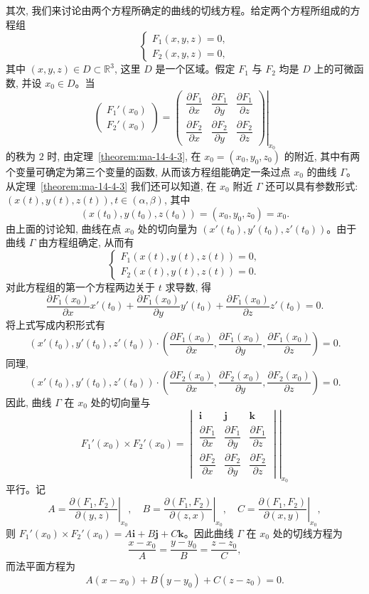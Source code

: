 其次, 我们来讨论由两个方程所确定的曲线的切线方程。给定两个方程所组成的方程组
\[
  \begin{cases}
    F_1(x,y,z)=0,\\
    F_2(x,y,z)=0,
  \end{cases}
\]
其中 $(x,y,z)\in D\subset\mathbb R^3$, 这里 $D$ 是一个区域。假定 $F_1$ 与 $F_2$ 均是 $D$ 上的可微函数, 并设 $x_0\in D$。当
\[
  \begin{pmatrix}
    F_1'(x_0)\\
    F_2'(x_0)
  \end{pmatrix}
  =
  \left.
  \begin{pmatrix}
    \dfrac{\partial F_1}{\partial x} & \dfrac{\partial F_1}{\partial y} & \dfrac{\partial F_1}{\partial z}\\
    \dfrac{\partial F_2}{\partial x} & \dfrac{\partial F_2}{\partial y} & \dfrac{\partial F_2}{\partial z}
  \end{pmatrix}
  \right|_{x_0}
\]
的秩为 $2$ 时, 由定理~\ref{theorem:ma-14-4-3}, 在 $x_0=(x_0,y_0,z_0)$ 的附近, 其中有两个变量可确定为第三个变量的函数, 从而该方程组能确定一条过点 $x_0$ 的曲线 $\Gamma$。从定理~\ref{theorem:ma-14-4-3} 我们还可以知道, 在 $x_0$ 附近 $\Gamma$ 还可以具有参数形式: $(x(t),y(t),z(t)),t\in(\alpha,\beta)$, 其中
\[
  (x(t_0),y(t_0),z(t_0))=(x_0,y_0,z_0)=x_0.
\]
由上面的讨论知, 曲线在点 $x_0$ 处的切向量为 $(x'(t_0),y'(t_0),z'(t_0))$。由于曲线 $\Gamma$ 由方程组确定, 从而有
\[
  \begin{cases}
    F_1(x(t),y(t),z(t))=0,\\
    F_2(x(t),y(t),z(t))=0.
  \end{cases}
\]
对此方程组的第一个方程两边关于 $t$ 求导数, 得
\[
  \frac{\partial F_1(x_0)}{\partial x}x'(t_0)
  +
  \frac{\partial F_1(x_0)}{\partial y}y'(t_0)
  +
  \frac{\partial F_1(x_0)}{\partial z}z'(t_0)
  =0.
\]
将上式写成内积形式有
\[
  (x'(t_0),y'(t_0),z'(t_0))\cdot
  \left(
    \frac{\partial F_1(x_0)}{\partial x},
    \frac{\partial F_1(x_0)}{\partial y},
    \frac{\partial F_1(x_0)}{\partial z}
  \right)
  =0.
\]
同理,
\[
  (x'(t_0),y'(t_0),z'(t_0))\cdot
  \left(
    \frac{\partial F_2(x_0)}{\partial x},
    \frac{\partial F_2(x_0)}{\partial y},
    \frac{\partial F_2(x_0)}{\partial z}
  \right)
  =0.
\]
因此, 曲线 $\Gamma$ 在 $x_0$ 处的切向量与
\[
  F_1'(x_0)\times F_2'(x_0)
  =
  \left.
  \begin{vmatrix}
    \mathbf i & \mathbf j & \mathbf k\\
    \dfrac{\partial F_1}{\partial x} & \dfrac{\partial F_1}{\partial y} & \dfrac{\partial F_1}{\partial z}\\
    \dfrac{\partial F_2}{\partial x} & \dfrac{\partial F_2}{\partial y} & \dfrac{\partial F_2}{\partial z}
  \end{vmatrix}
  \right|_{x_0}
\]
平行。记
\[
  A=\left.\frac{\partial(F_1,F_2)}{\partial(y,z)}\right|_{x_0},\quad
  B=\left.\frac{\partial(F_1,F_2)}{\partial(z,x)}\right|_{x_0},\quad
  C=\left.\frac{\partial(F_1,F_2)}{\partial(x,y)}\right|_{x_0},
\]
则 $F_1'(x_0)\times F_2'(x_0)=A\mathbf i+B\mathbf j+C\mathbf k$。因此曲线 $\Gamma$ 在 $x_0$ 处的切线方程为
\[
  \frac{x-x_0}{A}=\frac{y-y_0}{B}=\frac{z-z_0}{C},
\]
而法平面方程为
\[
  A(x-x_0)+B(y-y_0)+C(z-z_0)=0.
\]

